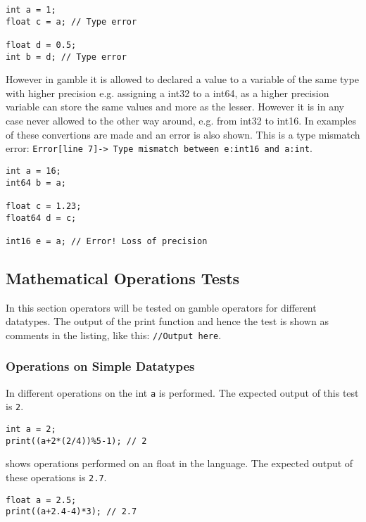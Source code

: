 \begin{lstlisting}[caption={Examples of type incompatibilities \gls{gamble} to demonstrate the type checker.},label={lst:type2},frame=tb]
int a = 1;
float c = a; // Type error

float d = 0.5;
int b = d; // Type error
\end{lstlisting}

However in \gls{gamble} it is allowed to declared a value to a variable of the same type with higher precision e.g. assigning a int32 to a int64, as a higher precision variable can store the same values and more as the lesser.
However it is in any case never allowed to the other way around, e.g. from int32 to int16.
In  examples of these convertions are made and an error is also shown.
This is a type mismatch error: \texttt{Error[line    7]-> Type mismatch between e:int16 and a:int}.

\begin{lstlisting}[caption={Examples of type conversions and an error in \gls{gamble} to demonstrate the type checker.},label={lst:type3},frame=tb]
int a = 16;
int64 b = a;

float c = 1.23;
float64 d = c;

int16 e = a; // Error! Loss of precision
\end{lstlisting}

\subsection*{Mathematical Operations Tests}
In this section operators will be tested on \gls{gamble} operators for different datatypes.
The output of the print function and hence the test is shown as comments in the listing, like this: \texttt{//Output here}.

\subsubsection*{Operations on Simple Datatypes}
In  different operations on the int \texttt{a} is performed.
The expected output of this test is \texttt{2}.
\begin{lstlisting}[caption={Example of a scope error in \gls{gamble}},label={lst:SimpleOps1},frame=tb]
int a = 2;
print((a+2*(2/4))%5-1); // 2
\end{lstlisting}

 shows operations performed on an float in the language.
The expected output of these operations is \texttt{2.7}.
\begin{lstlisting}[caption={Example of a scope error in \gls{gamble}},label={lst:SimpleOps2},frame=tb]
float a = 2.5;
print((a+2.4-4)*3); // 2.7
\end{lstlisting}

